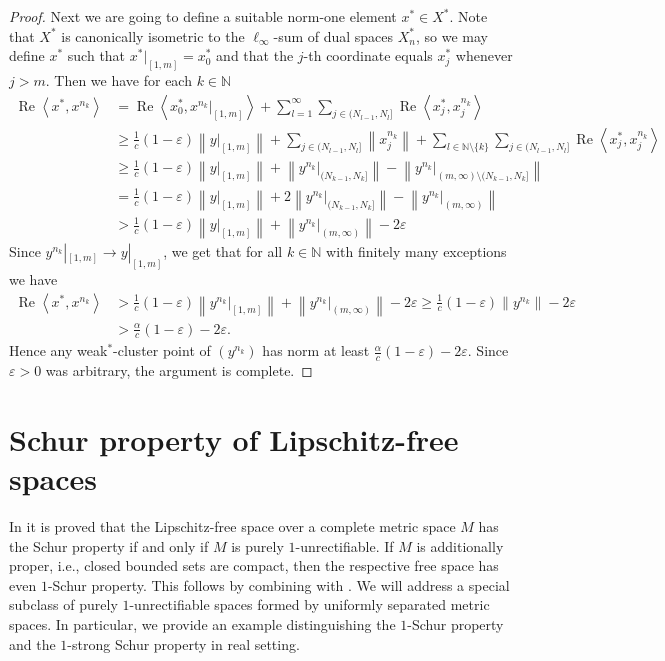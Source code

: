\documentclass{amsart}
\numberwithin{equation}{section}
\theoremstyle{definition}
\def\ep{\varepsilon}
\def\en{\mathbb N}
\def\ip#1#2{\left\langle#1,#2\right\rangle}
\newcommand{\norm}[1]{\left\|#1\right\|}
\renewcommand{\Re}{\operatorname{Re}}
\begin{document}
\begin{proof}
    Next we are going to define a suitable norm-one element $x^*\in X^*$. Note that $X^*$ is canonically isometric to the $\ell_\infty$-sum of dual spaces $X_n^*$, so we may define $x^*$ such that $x^*|_{[1,m]}=x_0^*$ and that the $j$-th coordinate equals $x^*_j$ whenever $j>m$.
    Then we have for each $k\in\en$ 
    $$\begin{aligned}
        \Re\ip{x^*}{x^{n_k}}&=\Re\ip{x_0^*}{x^{n_k}|_{[1,m]}} + \sum_{l=1}^\infty \sum_{j\in (N_{l-1},N_l]} \Re\ip{x^*_j}{x^{n_k}_j}
        \\&\ge \tfrac1c(1-\ep)\norm{y|_{[1,m]}} +\sum_{j\in (N_{l-1},N_l]} \norm{x^{n_k}_j} + \sum_{l\in\en\setminus\{k\}} \sum_{j\in (N_{l-1},N_l]} \Re\ip{x^*_j}{x^{n_k}_j}
        \\&\ge  \tfrac1c(1-\ep)\norm{y|_{[1,m]}} + \norm{y^{n_k}|_{(N_{k-1},N_k]}} - \norm{y^{n_k}|_{(m,\infty)\setminus(N_{k-1},N_k]}}
        \\&=\tfrac1c(1-\ep)\norm{y|_{[1,m]}} +2 \norm{y^{n_k}|_{(N_{k-1},N_k]}} - \norm{y^{n_k}|_{(m,\infty)}}
        \\&>\tfrac1c(1-\ep)\norm{y|_{[1,m]}}+\norm{y^{n_k}|_{(m,\infty)}}-2\ep
    \end{aligned}$$
    Since $y^{n_k}|_{[1,m]}\to y|_{[1,m]}$, we get that for all $k\in\en$ with finitely many exceptions we have
    $$\begin{aligned}         
    \Re\ip{x^*}{x^{n_k}}&>\tfrac1c(1-\ep)\norm{y^{n_k}|_{[1,m]}}+\norm{y^{n_k}|_{(m,\infty)}}-2\ep
    \ge \tfrac1c(1-\ep)\norm{y^{n_k}}-2\ep\\&>\tfrac\alpha{c}(1-\ep)-2\ep.\end{aligned}$$
    Hence any weak$^*$-cluster point of $(y^{n_k})$ has norm at least $\tfrac\alpha{c}(1-\ep)-2\ep$. Since $\ep>0$ was arbitrary, the argument is complete.   
\end{proof}

\section{Schur property of Lipschitz-free spaces}\label{sec:LF}

In  \cite[Theorem C]{p1u}  it is proved that the Lipschitz-free space over a complete metric space $M$ has the Schur property if and only if $M$ is purely $1$-unrectifiable. If $M$ is additionally proper, i.e., closed bounded sets are compact, then the respective free space has even $1$-Schur property. This follows by combining \cite[Proposition 17]{petitjean-schur} with \cite[Theorem 3.2]{p1u}. We will address a special subclass of purely $1$-unrectifiable spaces formed by uniformly separated metric spaces. In particular, we provide an example distinguishing the $1$-Schur property and the $1$-strong Schur property in real setting.
\end{document}
